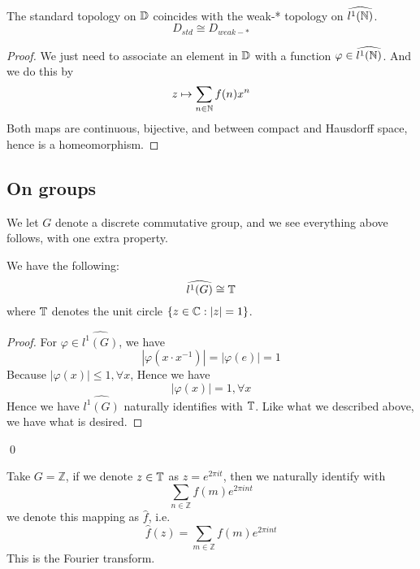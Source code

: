 \begin{proposition}
    The standard topology on $\mathbb{D}$ coincides with the weak-* topology on $\widehat{l^1(\mathbb{N})}$.
    \begin{equation*}
        D_{std}\cong D_{weak-*}
    \end{equation*}
\end{proposition}
\begin{proof}
    We just need to associate an element in $\mathbb{D}$ with a function $\varphi\in\widehat{l^1(\mathbb{N})}$. And we do this by
    \begin{equation*}
        z\mapsto \sum_{n\in\mathbb{N}}f(n)x^n
    \end{equation*}
    Both maps are continuous, bijective, and between compact and Hausdorff space, hence is a homeomorphism.
\end{proof}

\subsection{On groups}

We let $G$ denote a discrete commutative group, and we see everything above follows, with one extra property.

\begin{proposition}
    We have the following:
    \begin{equation*}
        \widehat{l^1(G)}\cong \mathbb{T}
    \end{equation*}
    where $\mathbb{T}$ denotes the unit circle $\{z\in\mathbb{C}: |z|=1\}$.
\end{proposition}
\begin{proof}
    For $\varphi\in\widehat{l^1(G)}$, we have
    \begin{equation*}
        |\varphi(x\cdot x^{-1})|=|\varphi(e)|=1
    \end{equation*}
    Because $|\varphi(x)|\leq 1, \forall x$, Hence we have
    \begin{equation*}
        |\varphi(x)|=1, \forall x
    \end{equation*}
    Hence we have $\widehat{l^1(G)}$ naturally identifies with $\mathbb{T}$. Like what we described above, we have what is desired.
\end{proof}
\qed

\begin{remark}
    Take $G=\mathbb{Z}$, if we denote $z\in\mathbb{T}$ as $z=e^{2\pi it}$, then we naturally identify with
    \begin{equation*}
        \sum_{n\in\mathbb{Z}}f(m)e^{2\pi int}
    \end{equation*}
    we denote this mapping as $\widehat{f}$, i.e.
    \begin{equation*}
        \widehat{f}(z)=\sum_{m\in\mathbb{Z}}f(m)e^{2\pi int}
    \end{equation*}
    This is the Fourier transform.
\end{remark}

